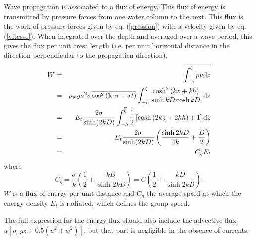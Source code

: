 Wave propagation is associated to a flux of energy. This flux of energy is transmitted by pressure forces
from one water column to the next. This flux is the work 
of pressure forces given by eq. (\ref{pression}) with a velocity given by eq. (\ref{vitesse}). 
When integrated over the depth and averaged over a wave period, this gives the flux per unit crest length (i.e. per unit horizontal 
distance in the direction perpendicular to the propagation direction), 
\begin{eqnarray}
    W & = & \overline{ \int_{-h} ^{\zeta} p u \mathrm{d}z } \nonumber \\
        & = & \rho_w g a^2 \sigma
        \overline{ \cos^2\left({\mathbf k} \mbox{\boldmath $\cdot$} {\mathbf x} - \sigma t \right)  }
        \int_{-h} ^{\zeta} \frac{\cosh^2 \left(kz+kh \right)}{\sinh kD \cosh kD}
        ~ \mathrm{d}z \nonumber \\
        & = & E_t \frac{2  \sigma}{\sinh (2 kD)}
        \int_{-h}^{\overline{\zeta}} \frac{1}{2}\left[\cosh \left(2kz+2kh\right) +1 \right]
        \mathrm{d}z \nonumber \\
        & = & E_t \frac{2  \sigma}{\sinh (2 kD)}
        \left(\frac{\sinh 2kD}{4k}+\frac{D}{2} \right) \nonumber \\
        & = & C_g E_t \label{W}
\end{eqnarray}
where
\begin{equation}
C_g=\frac{\sigma}{k}
        \left(\frac{1}{2}+\frac{kD}{\sinh 2kD}\right)= C \left(\frac{1}{2}+\frac{kD}{\sinh 2kD}\right). \label{Cg}
\end{equation}
$W$ is a flux of energy per unit distance and $C_g$ the average speed at which the energy density $E_t$ is radiated, 
which defines the group speed. 

The full expression for the energy flux should also include the advective flux  $u \left[\rho_w g z + 0.5\left(u^2 +
w^2\right) \right]$, but that part is negligible in the absence of currents. 

